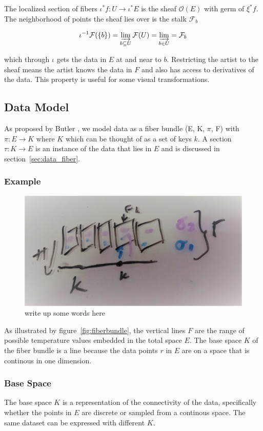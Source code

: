 \documentclass[../main.tex]{subfiles}
\begin{document}
The localized section of fibers $\iota^*f: U \rightarrow \iota^*E$ is the sheaf $\mathcal{O}(E)$ with germ of $\xi^*f$. The neighborhood of points the sheaf lies over is the stalk $\mathcal{F}_b$ \cite{StalkSheaf2019,spanier1989algebraic}

\begin{equation}
    \label{eq:stalk}
    \iota^{-1}\mathcal{F}(\{b\}) = \varinjlim_{b\subseteq U}\mathcal{F}(U) =  \varinjlim_{b \in U} = \mathcal{F}_b 
\end{equation}

which through $\iota$ gets the data in $E$ at and near to $b$. Restricting the artist to the sheaf means the artist knows the data in $F$ and also has access to derivatives of the data. This property is useful for some visual transformations. 

\subsection{Data Model}
As proposed by Butler \cite{butlerVectorBundleClassesForm1992,butlerVisualizationModelBased1989}, we model data as a fiber bundle (E, K, $\pi$, F) with $\pi: E \rightarrow K$ where $K$ which can be thought of as a set of keys $k$. A section $\tau:K \rightarrow E$ is an instance of the data that lies in $E$ and is discussed in section~\ref{sec:data_fiber}. 

\subsubsection{Example}

\begin{figure}[ht]
    \label{fig:data_fiber_bundle}
    \includegraphics[width=.2\linewidth]{figures/sections/math/fiberbundle.png}
    \caption{write up some words here}
\end{figure}

As illustrated by figure~\ref{fig:fiberbundle}, the vertical lines $F$ are the range of possible temperature values embedded in the total space $E$. The base space $K$ of the fiber bundle is a line because the data points $r$ in $E$ are on a space that is  continous in one dimension. 

\subsubsection{Base Space}
The base space $K$ is a representation of the connectivity of the data, specifically whether the points in $E$ are discrete or sampled from a continous space. The same dataset can be expressed with different $K$. 
\end{document}
